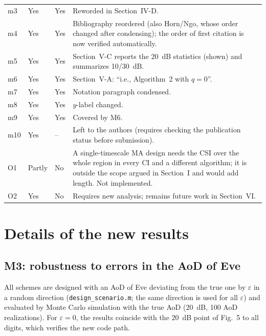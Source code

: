 \documentclass[10pt,a4paper]{article}
\newcommand{\code}[1]{\texttt{#1}}
\newcommand{\yes}{\textcolor{green!45!black}{Yes}}
\newcommand{\no}{\textcolor{red!70!black}{No}}
\newcommand{\partly}{\textcolor{orange!80!black}{Partly}}
\begin{document}
{\begin{longtable}{p{1.3cm}p{0.9cm}p{1.3cm}p{11.2cm}}
m3 & \yes & \yes & Reworded in Section~IV-D. \\
m4 & \yes & \yes & Bibliography reordered (also Horn/Ngo, whose order changed after condensing); the order of first citation is now verified automatically. \\
m5 & \yes & \yes & Section~V-C reports the 20~dB statistics (shown) and summarizes 10/30~dB. \\
m6 & \yes & \yes & Section~V-A: ``i.e., Algorithm~2 with $q=0$''. \\
m7 & \yes & \yes & Notation paragraph condensed. \\
m8 & \yes & \yes & $y$-label changed. \\
m9 & \yes & \yes & Covered by M6. \\
m10 & \yes & -- & Left to the authors (requires checking the publication status before submission). \\
O1 & \partly & \no & A single-timescale MA design needs the CSI over the whole region in every CI and a different algorithm; it is outside the scope argued in Section~I and would add length. Not implemented. \\
O2 & \yes & \no & Requires new analysis; remains future work in Section~VI. \\
\bottomrule
\end{longtable}
}

\section{Details of the new results}
\subsection{M3: robustness to errors in the AoD of Eve}\label{sec:m3}
All schemes are designed with an AoD of Eve deviating from the true one by $\varepsilon$ in a random direction (\code{design\_scenario.m}; the same direction is used for all $\varepsilon$) and evaluated by Monte Carlo simulation with the true AoD ($20$~dB, 100 AoD realizations). For $\varepsilon=0$, the results coincide with the $20$~dB point of Fig.~5 to all digits, which verifies the new code path.
\end{document}
